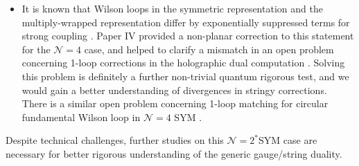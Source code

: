 \begin{itemize}
  \item It is known that Wilson loops in the symmetric representation and the multiply-wrapped representation differ 
 by exponentially suppressed terms for strong coupling \cite{Yamaguchi:2007ps}. 
 Paper IV provided a non-planar correction to this statement for the $\mathcal{N}=4$ case, 
 and helped to clarify a mismatch in an open problem concerning 1-loop corrections 
 in the holographic dual computation \cite{Faraggi:2014tna, Buchbinder:2014nia}. 
 Solving this problem is definitely a further non-trivial quantum rigorous test, 
 and we would gain a better understanding of divergences in stringy corrections. 
 There is a similar open problem concerning 1-loop matching for circular fundamental Wilson loop 
 in $\mathcal{N}=4$ SYM \cite{Kruczenski:2008zk, Kristjansen:2012nz, Bergamin:2015vxa, Forini:2015bgo, Faraggi:2016ekd, Forini:2017whz}.

\end{itemize}


Despite technical challenges, 
further studies on this $\mathcal{N}=2^*$SYM case are necessary for better rigorous understanding of the generic gauge/string duality.


